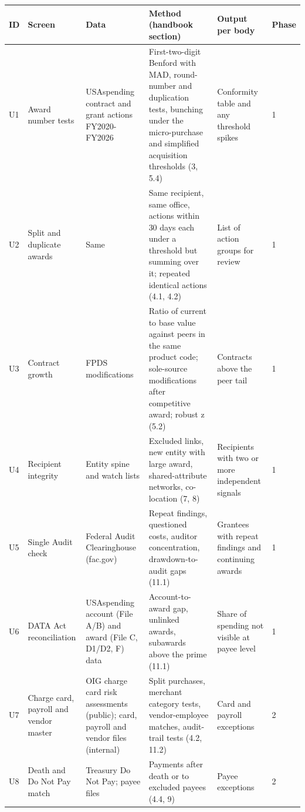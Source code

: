 \documentclass[letterpaper,11pt]{article}
\begin{document}
\begingroup\small\setlength{\tabcolsep}{4pt}\renewcommand{\arraystretch}{1.25}
\begin{longtable}[l]{@{}l>{\raggedright\arraybackslash}p{}>{\raggedright\arraybackslash}p{}>{\raggedright\arraybackslash}p{}>{\raggedright\arraybackslash}p{}l@{}}
\rowcolor{coolblack}\leavevmode\color{white}\bfseries ID & \leavevmode\color{white}\bfseries Screen & \leavevmode\color{white}\bfseries Data & \leavevmode\color{white}\bfseries Method (handbook section) & \leavevmode\color{white}\bfseries Output per body & \leavevmode\color{white}\bfseries Phase \\
\endhead
U1 & Award number tests & USAspending contract and grant actions FY2020-FY2026 & First-two-digit Benford with MAD, round-number and duplication tests, bunching under the micro-purchase and simplified acquisition thresholds (3, 5.4) & Conformity table and any threshold spikes & 1 \\
U2 & Split and duplicate awards & Same & Same recipient, same office, actions within 30 days each under a threshold but summing over it; repeated identical actions (4.1, 4.2) & List of action groups for review & 1 \\
U3 & Contract growth & FPDS modifications & Ratio of current to base value against peers in the same product code; sole-source modifications after competitive award; robust z (5.2) & Contracts above the peer tail & 1 \\
U4 & Recipient integrity & Entity spine and watch lists & Excluded links, new entity with large award, shared-attribute networks, co-location (7, 8) & Recipients with two or more independent signals & 1 \\
U5 & Single Audit check & Federal Audit Clearinghouse (fac.gov) & Repeat findings, questioned costs, auditor concentration, drawdown-to-audit gaps (11.1) & Grantees with repeat findings and continuing awards & 1 \\
U6 & DATA Act reconciliation & USAspending account (File A/B) and award (File C, D1/D2, F) data & Account-to-award gap, unlinked awards, subawards above the prime (11.1) & Share of spending not visible at payee level & 1 \\
U7 & Charge card, payroll and vendor master & OIG charge card risk assessments (public); card, payroll and vendor files (internal) & Split purchases, merchant category tests, vendor-employee matches, audit-trail tests (4.2, 11.2) & Card and payroll exceptions & 2 \\
U8 & Death and Do Not Pay match & Treasury Do Not Pay; payee files & Payments after death or to excluded payees (4.4, 9) & Payee exceptions & 2 \\
\end{longtable}\endgroup
\end{document}
